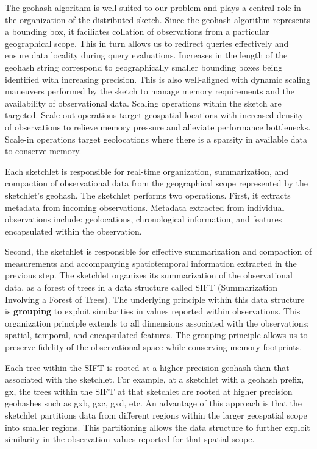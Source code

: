 The geohash algorithm is well suited to our problem and plays a central role in the organization of the distributed sketch. Since the geohash algorithm represents a bounding box, it faciliates collation of observations from a particular geographical scope. This in turn allows us to redirect queries effectively and ensure data locality during query evaluations. Increases in the length of the geohash string correspond to geographically smaller bounding boxes being identified with increasing precision. This is also well-aligned with dynamic scaling maneuvers performed by the sketch to manage memory requirements and the availability of observational data. Scaling operations within the sketch are targeted. Scale-out operations target geospatial locations with increased density of observations to relieve memory pressure and alleviate performance bottlenecks. Scale-in operations target geolocations where there is a sparsity in available data to conserve memory.

Each sketchlet is responsible for real-time organization, summarization, and compaction of observational data from the geographical scope represented by the sketchlet’s geohash.  The sketchlet performs two operations. First, it extracts metadata from incoming observations. Metadata extracted from individual observations include: geolocations, chronological information, and features encapsulated within the observation.

Second, the sketchlet is responsible for effective summarization and compaction of measurements and accompanying spatiotemporal information extracted in the previous step. The sketchlet organizes its summarization of the observational data, as a forest of trees in a data structure called SIFT (Summarization Involving a Forest of Trees). The underlying principle within this data structure is \textbf{grouping} to exploit similarities in values reported within observations. This organization principle extends to all dimensions associated with the observations: spatial, temporal, and encapsulated features. The grouping principle allows us to preserve fidelity of the observational space while conserving memory footprints.

Each tree within the SIFT is rooted at a higher precision geohash than that associated with the sketchlet. For example, at a sketchlet with a geohash prefix, gx, the trees within the SIFT at that sketchlet are rooted at higher precision geohashes such as gxb, gxc, gxd, etc. An advantage of this approach is that the sketchlet partitions data from different regions within the larger geospatial scope into smaller regions. This partitioning allows the data structure to further exploit similarity in the observation values reported for that spatial scope. 

